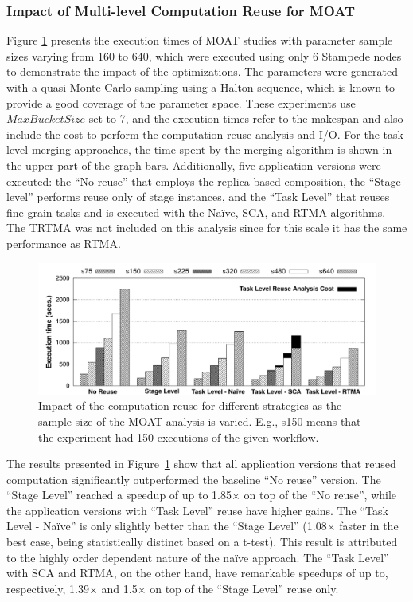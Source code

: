 \subsubsection{Impact of Multi-level Computation Reuse for MOAT}

Figure \ref{fig:reuse-overall} presents the execution times of MOAT studies
with parameter sample sizes varying from 160 to 640, which were executed using
only 6 Stampede nodes to demonstrate the impact of the optimizations. The parameters
were generated with a quasi-Monte Carlo sampling using a Halton sequence, which
is known to provide a good coverage of the parameter space. These experiments
use $MaxBucketSize$ set to 7, and the execution times refer to the makespan and
also include the cost to perform the computation reuse analysis and I/O.  
For the task level
merging approaches, the time spent by the merging algorithm is shown in the
upper part of the graph bars.  Additionally, five application versions were
executed: the ``No reuse'' that employs the replica based composition, the
``Stage level'' performs reuse only of stage instances, and the ``Task Level''
that reuses fine-grain tasks and is executed with the Na\"ive, SCA, and RTMA
algorithms. The TRTMA was not included on this analysis since for this scale it has the same performance as RTMA.

\begin{figure}[h]
\begin{center}
	\includegraphics[width=1\textwidth]{img/moat-reuse}
	\caption{Impact of the computation reuse for different strategies as the sample size of the MOAT analysis is varied. E.g., s150 means that the experiment had 150 executions of the given workflow.}
	\label{fig:reuse-overall}
\end{center}
\end{figure}

The results presented in Figure~\ref{fig:reuse-overall} show that all application versions that reused computation significantly outperformed the baseline ``No reuse'' version. The ``Stage Level'' reached a speedup of up to 1.85$\times$ on top of the ``No reuse'', while the application versions with ``Task Level'' reuse have higher gains. The ``Task Level - Na\"ive'' is only slightly better than the ``Stage Level'' (1.08$\times$ faster in the best case, being statistically distinct based on a t-test). This result is attributed to the highly order dependent nature of the na\"ive approach. The ``Task Level'' with SCA and RTMA, on the other hand, have remarkable speedups of up to, respectively, 1.39$\times$ and 1.5$\times$ on top of the ``Stage Level'' reuse only. 

